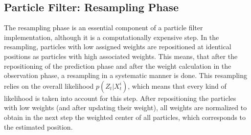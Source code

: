 \subsection{Particle Filter: Resampling Phase}
The resampling phase is an essential component of a particle filter implementation, although it is a computationally expensive step. In the resampling, particles with low assigned weights are repositioned at identical positions as particles with high associated weights. This means, that after the repositioning of the prediction phase and after the weight calculation in the observation phase, a resampling in a systematic manner is done. This resampling relies on the overall likelihood $p(Z_{t} | X^{i}_{t})$, which means that every kind of likelihood is taken into account for this step. After repositioning the particles with low weights (and after updating their weight), all weights are normalized to obtain in the next step the weighted center of all particles, which corresponds to the estimated position. 




